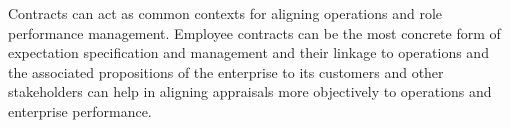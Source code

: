 Contracts can act as common contexts for aligning operations and role performance management.
Employee contracts can be the most concrete form of expectation specification and management and their
linkage to operations and the associated propositions of the enterprise to its customers and other
stakeholders can help in aligning appraisals more objectively to operations and enterprise performance.

